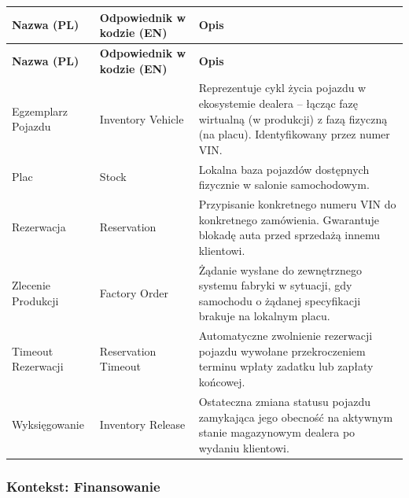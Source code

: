 \begin{longtable}{|p{4cm}|p{4cm}|p{8cm}|}
\hline
\textbf{Nazwa (PL)} & \textbf{Odpowiednik w kodzie (EN)} & \textbf{Opis} \\
\hline
\endfirsthead

\hline
\textbf{Nazwa (PL)} & \textbf{Odpowiednik w kodzie (EN)} & \textbf{Opis} \\
\hline
\endhead

Egzemplarz Pojazdu & Inventory Vehicle & Reprezentuje cykl życia pojazdu w ekosystemie dealera – łącząc fazę wirtualną (w produkcji) z fazą fizyczną (na placu). Identyfikowany przez numer VIN. \\
\hline

Plac & Stock & Lokalna baza pojazdów dostępnych fizycznie w salonie samochodowym. \\
\hline

Rezerwacja & Reservation & Przypisanie konkretnego numeru VIN do konkretnego zamówienia. Gwarantuje blokadę auta przed sprzedażą innemu klientowi. \\
\hline

Zlecenie Produkcji & Factory Order & Żądanie wysłane do zewnętrznego systemu fabryki w sytuacji, gdy samochodu o żądanej specyfikacji brakuje na lokalnym placu. \\
\hline

Timeout Rezerwacji & Reservation Timeout & Automatyczne zwolnienie rezerwacji pojazdu wywołane przekroczeniem terminu wpłaty zadatku lub zapłaty końcowej. \\
\hline

Wyksięgowanie & Inventory Release & Ostateczna zmiana statusu pojazdu zamykająca jego obecność na aktywnym stanie magazynowym dealera po wydaniu klientowi. \\
\hline
\end{longtable}

\subsubsection{Kontekst: Finansowanie}

